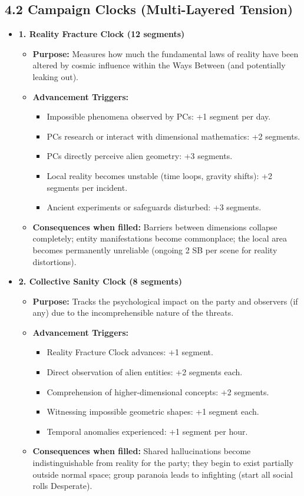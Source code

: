 \documentclass[11pt]{article}
\begin{document}
\clearpage

\subsection*{4.2 Campaign Clocks (Multi-Layered Tension)}

\begin{itemize}
\item \textbf{1. Reality Fracture Clock (12 segments)}
\begin{itemize}
\item \textbf{Purpose:} Measures how much the fundamental laws of reality have been altered by cosmic influence within the Ways Between (and potentially leaking out).
\item \textbf{Advancement Triggers:}
\begin{itemize}
\item Impossible phenomena observed by PCs: +1 segment per day.
\item PCs research or interact with dimensional mathematics: +2 segments.
\item PCs directly perceive alien geometry: +3 segments.
\item Local reality becomes unstable (time loops, gravity shifts): +2 segments per incident.
\item Ancient experiments or safeguards disturbed: +3 segments.
\end{itemize}
\item \textbf{Consequences when filled:} Barriers between dimensions collapse completely; entity manifestations become commonplace; the local area becomes permanently unreliable (ongoing 2 SB per scene for reality distortions).
\end{itemize}

\item \textbf{2. Collective Sanity Clock (8 segments)}
\begin{itemize}
\item \textbf{Purpose:} Tracks the psychological impact on the party and observers (if any) due to the incomprehensible nature of the threats.
\item \textbf{Advancement Triggers:}
\begin{itemize}
\item Reality Fracture Clock advances: +1 segment.
\item Direct observation of alien entities: +2 segments each.
\item Comprehension of higher-dimensional concepts: +2 segments.
\item Witnessing impossible geometric shapes: +1 segment each.
\item Temporal anomalies experienced: +1 segment per hour.
\end{itemize}
\item \textbf{Consequences when filled:} Shared hallucinations become indistinguishable from reality for the party; they begin to exist partially outside normal space; group paranoia leads to infighting (start all social rolls Desperate).
\end{itemize}


\end{itemize}
\end{document}

